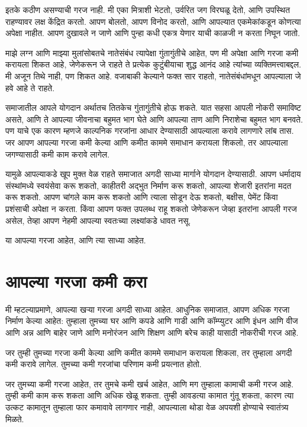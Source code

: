 इतके कठीण असण्याची गरज नाही. मी एका मित्राशी भेटतो, उर्वरित जग विरघळू देतो, आणि उपस्थित राहण्यावर लक्ष केंद्रित करतो. आपण बोलतो, आपण विनोद करतो, आणि आपल्यात एकमेकांकडून कोणत्या अपेक्षा नाहीत. आपण दुखावले न जाणे आणि पुन्हा कधी एकत्र येणार याची काळजी न करता निघून जातो.

माझे लग्न आणि माझ्या मुलांसोबतचे नातेसंबंध त्यापेक्षा गुंतागुंतीचे आहेत, पण मी अपेक्षा आणि गरजा कमी करायला शिकत आहे, जेणेकरून जे राहते ते प्रत्येक कुटुंबीयाचा शुद्ध आनंद आहे त्यांच्या व्यक्तिमत्त्वाबद्दल. मी अजून तिथे नाही, पण शिकत आहे. वजाबाकी केल्याने फक्त सार राहतो, नातेसंबंधांमधून आपल्याला जे हवे आहे ते राहते.

समाजातील आपले योगदान अर्थातच तितकेच गुंतागुंतीचे होऊ शकते. यात सहसा आपली नोकरी समाविष्ट असते, आणि ते आपल्या जीवनाचा बहुमत भाग घेते आणि आपल्या ताण आणि निराशेचा बहुमत भाग बनवते. पण याचे एक कारण म्हणजे काल्पनिक गरजांना आधार देण्यासाठी आपल्याला करावे लागणारे लांब तास. जर आपण आपल्या गरजा कमी केल्या आणि कमीत काममे समाधान करायला शिकलो, तर आपल्याला जगण्यासाठी कमी काम करावे लागेल.

यामुळे आपल्याकडे खूप मुक्त वेळ राहते समाजात अगदी साध्या मार्गाने योगदान देण्यासाठी. आपण धर्मादाय संस्थांमध्ये स्वयंसेवा करू शकतो, काहीतरी अद्भुत निर्माण करू शकतो, आपल्या शेजारी इतरांना मदत करू शकतो. आपण चांगले काम करू शकतो आणि त्याला सोडून देऊ शकतो, बक्षीस, पेमेंट किंवा प्रशंसाची अपेक्षा न करता. किंवा आपण फक्त उपलब्ध राहू शकतो जेणेकरून जेव्हा इतरांना आपली गरज असेल, तेव्हा आपण नेहमी आपल्या स्वतःच्या लक्ष्यांकडे धावत नसू.

या आपल्या गरजा आहेत, आणि त्या साध्या आहेत.

\chapter{आपल्या गरजा कमी करा}

मी म्हटल्याप्रमाणे, आपल्या खऱ्या गरजा अगदी साध्या आहेत. आधुनिक समाजात, आपण अधिक गरजा निर्माण केल्या आहेत: तुम्हाला तुमच्या घर आणि कपडे आणि गाडी आणि कॉम्प्युटर आणि इंधन आणि वीज आणि अन्न आणि बाहेर जाणे आणि मनोरंजन आणि शिक्षण आणि बरेच काही यासाठी नोकरीची गरज आहे.

जर तुम्ही तुमच्या गरजा कमी केल्या आणि कमीत काममे समाधान करायला शिकला, तर तुम्हाला अगदी कमी करावे लागेल. तुमच्या कमी गरजांचा परिणाम कमी प्रयत्नात होतो.

जर तुमच्या कमी गरजा आहेत, तर तुमचे कमी खर्च आहेत, आणि मग तुम्हाला कामाची कमी गरज आहे. तुम्ही कमी काम करू शकता आणि अधिक खेळू शकता. तुम्ही आवडत्या कामात गुंतू शकता, कारण त्या उत्कट कामातून तुम्हाला फार कमावावे लागणार नाही, आपल्याला थोडा वेळ अपयशी होण्याचे स्वातंत्र्य मिळते.

